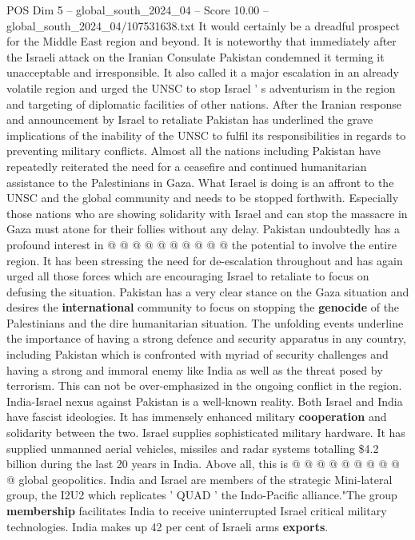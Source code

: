 \begin{textsample}{POS Dim 5 – global\_south\_2024\_04 – Score 10.00 – global\_south\_2024\_04/107531638.txt}
It would certainly be a dreadful prospect for the Middle East region and beyond.
It is noteworthy that immediately after the Israeli attack on the Iranian Consulate Pakistan condemned it terming it unacceptable and irresponsible.
It also called it a major escalation in an already volatile region and urged the UNSC to stop Israel ' s adventurism in the region and targeting of diplomatic facilities of other nations.
After the Iranian response and announcement by Israel to retaliate Pakistan has underlined the grave implications of the inability of the UNSC to fulfil its responsibilities in regards to preventing military conflicts.
Almost all the nations including Pakistan have repeatedly reiterated the need for a ceasefire and continued humanitarian assistance to the Palestinians in Gaza.
What Israel is doing is an affront to the UNSC and the global community and needs to be stopped forthwith.
Especially those nations who are showing solidarity with Israel and can stop the massacre in Gaza must atone for their follies without any delay.
Pakistan undoubtedly has a profound interest in @ @ @ @ @ @ @ @ @ @ the potential to involve the entire region.
It has been stressing the need for de-escalation throughout and has again urged all those forces which are encouraging Israel to retaliate to focus on defusing the situation.
Pakistan has a very clear stance on the Gaza situation and desires the \textbf{international} community to focus on stopping the \textbf{genocide} of the Palestinians and the dire humanitarian situation.
The unfolding events underline the importance of having a strong defence and security apparatus in any country, including Pakistan which is confronted with myriad of security challenges and having a strong and immoral enemy like India as well as the threat posed by terrorism.
This can not be over-emphasized in the ongoing conflict in the region.
India-Israel nexus against Pakistan is a well-known reality.
Both Israel and India have fascist ideologies.
It has immensely enhanced military \textbf{cooperation} and solidarity between the two.
Israel supplies sophisticated military hardware.
It has supplied unmanned aerial vehicles, missiles and radar systems totalling \$4.2 billion during the last 20 years in India.
Above all, this is @ @ @ @ @ @ @ @ @ @ global geopolitics.
India and Israel are members of the strategic Mini-lateral group, the I2U2 which replicates ' QUAD ' the Indo-Pacific alliance."The group \textbf{membership} facilitates India to receive uninterrupted Israel critical military technologies.
India makes up 42 per cent of Israeli arms \textbf{exports}.

\end{textsample}
